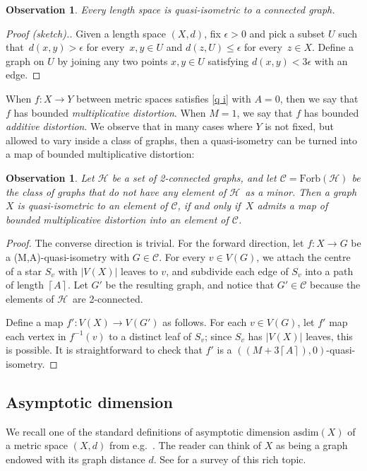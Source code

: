 \documentclass[a4paper]{article}
\newcommand{\defi}[1]{{\color{darkgray}\emph{#1}}}
\newtheorem{observation}[proposition]{Observation}
\newcommand{\cc}{\ensuremath{\mathcal C}}
\newcommand{\ch}{\ensuremath{\mathcal H}}
\newcommand{\ceil}[1]{\ensuremath{\left\lceil #1 \right\rceil}}
\renewcommand{\iff}{if and only if}
\newcommand{\fe}{for every}
\newcommand{\st}{such that}
\newcommand{\forb}[1]{\mathrm{Forb}(#1)}
\newcommand{\asdim}{\mathrm{asdim}}
\begin{document}
\begin{observation} \label{qi graph}
Every length space is quasi-isometric to a connected graph.
\end{observation}
\begin{proof}[Proof (sketch).]
Given a length space $(X,d)$, fix $\epsilon>0$ and pick a subset $U$ \st\ $d(x,y)>\epsilon$ \fe\ $x,y\in U$ and $d(z,U)\leq \epsilon$ \fe\ $z\in X$. Define a graph on $U$ by joining any two points $x,y\in U$ satisfying $d(x,y)< 3\epsilon$ with an edge. 
\end{proof}

When $f: X \to Y$ between metric spaces satisfies \ref{q i} 
with $A=0$, then we say that $f$ has bounded \defi{multiplicative distortion}. When $M=1$, we say that $f$ has bounded \defi{additive distortion}. We observe that in many cases where $Y$ is not fixed, but allowed to vary inside a class of graphs, then a quasi-isometry can be turned into a map of bounded multiplicative distortion: 
\begin{observation} \label{obs distortion}
Let $\ch$ be a set of 2-connected graphs, and let $\cc=\forb{\ch}$ be the class of graphs that do not have any element of \ch\ as a minor. Then a graph $X$ is quasi-isometric to an element of \cc, \iff\ $X$ admits a map of bounded multiplicative distortion into an element of \cc. 
\end{observation}
\begin{proof}
The converse direction is trivial. For the forward direction, let $f: X \to G$ be a (M,A)-quasi-isometry with $G\in \cc$. For every $v\in V(G)$, we attach the centre of a star $S_v$ with $|V(X)|$ leaves to $v$, and subdivide each edge of $S_v$ into a path of length $\ceil{A}$. Let $G'$ be the resulting graph, and notice that $G'\in \cc$ because the elements of \ch\ are 2-connected. 

Define a map $f': V(X) \to V(G')$ as follows. For each $v\in V(G)$, let $f'$ map each vertex in $f^{-1}(v)$ to a distinct leaf of $S_v$; since $S_v$ has $|V(X)|$ leaves, this is possible. It is straightforward to check that $f'$ is a $((M+3\ceil{A}),0)$-quasi-isometry. 
\end{proof}

\subsection{Asymptotic dimension} \label{sec asdim}
We recall one of the standard definitions of asymptotic dimension $\asdim(X)$ of a metric space $(X,d)$  from e.g.\ \cite{JorLanGeo}. The reader can think of $X$ as being a graph endowed with its graph distance $d$. See  \cite{BelDraAsy} for a survey of this rich topic.
 \smallskip
 
\end{document}
